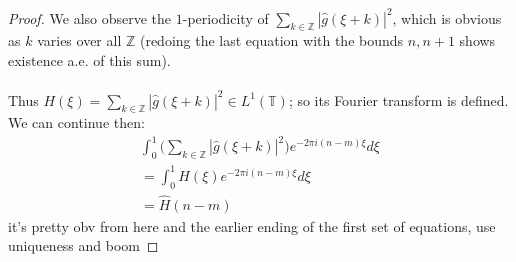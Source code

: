 \documentclass[12pt]{article}
\newenvironment{ex}[2][Exercise]{\begin{trivlist}
\item[\hskip \labelsep {\bfseries #1}\hskip \labelsep {\bfseries #2.}]}{\end{trivlist}}
\begin{document}
\begin{ex}{12}
\begin{proof}
        We also observe the $1$-periodicity of $\sum_{k \in \mathbb{Z}} |\hat{g}(\xi + k)|^2$, which is obvious as $k$ varies over all $\mathbb{Z}$ (redoing the last equation with the bounds $n, n+1$ shows existence a.e. of this sum). \\ \\
        Thus $H(\xi) = \sum_{k \in \mathbb{Z}} |\hat{g}(\xi + k)|^2 \in L^1(\mathbb{T})$; so its Fourier transform is defined. We can continue then:
        \begin{align*}
            \int_0^1 \Big ( \sum_{k \in \mathbb{Z}} |\hat{g}(\xi + k)|^2 \Big)e^{-2\pi i(n - m)\xi} d\xi \\
            = \int_0^1 H(\xi)e^{-2\pi i(n - m)\xi}d\xi \\
            = \hat{H}(n -m)
        \end{align*}
        it's pretty obv from here and the earlier ending of the first set of equations, use uniqueness and boom
    \end{proof}
\end{ex}
\end{document}
